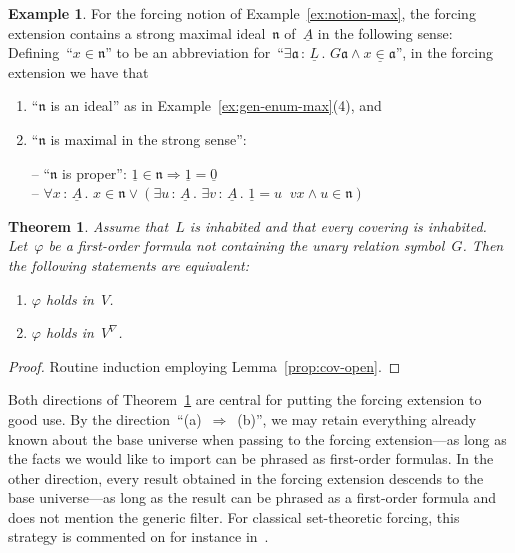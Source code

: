 \documentclass[com,11pt,crcready]{iosart2x}
\theoremstyle{definition}
\newtheorem{example}[definition]{Example}
\theoremstyle{plain}
\newtheorem{theorem}[definition]{Theorem}
\theoremstyle{remark}
\newcommand{\?}{\,{:}\,}
\newcommand{\aaa}{\mathfrak{a}}
\newcommand{\nnn}{\mathfrak{n}}
\renewcommand{\_}{\mathpunct{.}\,}
\begin{document}
\begin{example}\label{ex:gen-max}For the forcing notion of Example~\ref{ex:notion-max}, the
forcing extension contains a strong maximal ideal~$\nnn$ of~$\underline{A}$ in the following
sense: Defining~``$x \in \nnn$'' to be an abbreviation for~``$\exists
\aaa\?\underline{L}\_ G\aaa \wedge x \mathrel{\underline{\in}} \aaa$'',
in the forcing extension we have that
\begin{enumerate}
\item ``$\nnn$ is an ideal'' as in Example~\ref{ex:gen-enum-max}(4), and
\item ``$\nnn$ is maximal in the strong sense'':

-- ``$\nnn$ is proper'': $\underline{1} \in \nnn \Rightarrow \underline{1} =
\underline{0}$ \\
-- $\forall x\?\underline{A}\_ x \in \nnn \vee (\exists u\?\underline{A}\_
\exists v\?\underline{A}\_ \underline{1} = u \mathop{\underline{+}} vx \wedge u
\in \nnn)$
\end{enumerate}
\end{example}

\begin{theorem}\label{thm:backforth}Assume that~$L$ is inhabited and that every
covering is inhabited. Let~$\varphi$ be a first-order formula not containing
the unary relation symbol~$G$. Then the following statements are equivalent:
\begin{enumerate}
\item[(a)] $\varphi$ holds in~$V$.
\item[(b)] $\varphi$ holds in~$V^\nabla$.
\end{enumerate}
\end{theorem}

\begin{proof}Routine induction employing Lemma~\ref{prop:cov-open}.
\end{proof}

Both directions of Theorem~\ref{thm:backforth} are central for putting the
forcing extension to good use. By the direction~``(a)~$\Rightarrow$~(b)'',
we may retain everything already known about the base universe when passing to
the forcing extension---as long as the facts we would like to import can be
phrased as first-order formulas. In the other direction, every result obtained
in the forcing extension descends to the base universe---as long as the result
can be phrased as a first-order formula and does not mention the generic
filter. For classical set-theoretic forcing, this strategy is commented on for
instance in~\cite[Theorem~2]{hamkins:multiverse}.
\end{document}
